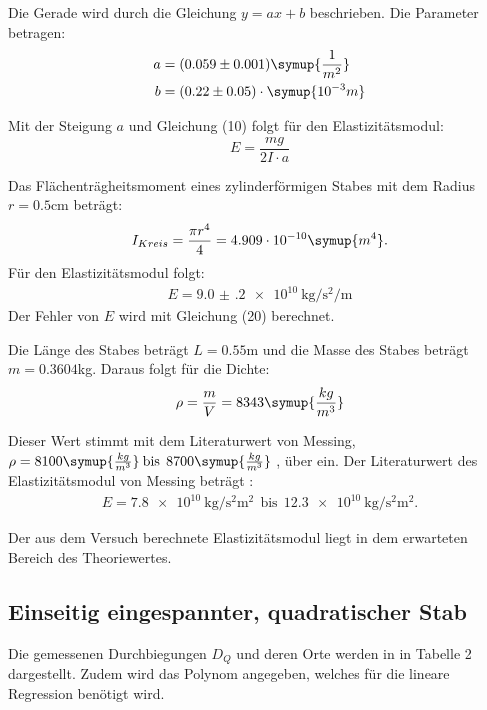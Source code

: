 Die Gerade wird durch die Gleichung $y = ax + b$ beschrieben. Die Parameter betragen:
\begin{align*}
  a &= (0.059 \pm 0.001) \symup{\frac{1}{m^2}}\\
  b &= (0.22  \pm 0.05) \cdot \symup{10^{-3}m}
\end{align*}

Mit der Steigung $a$ und Gleichung (10) folgt für den Elastizitätsmodul:
\begin{equation}
  E = \frac{mg}{2I \cdot a}
\end{equation}

Das Flächenträgheitsmoment eines zylinderförmigen Stabes mit dem Radius
$r = 0.5$cm beträgt:
\begin{equation}
  I_{Kreis} = \frac{\pi r^4}{4} = 4.909 \cdot 10^{-10} \symup{m^4} .
\end{equation}
Für den Elastizitätsmodul folgt:
\begin{align*}
  E = \SI{9.0(2)e10}{\kilo\gram\per\second\squared\per\meter}
\end{align*}
Der Fehler von $E$ wird mit Gleichung (20) berechnet.

Die Länge des Stabes beträgt $L = 0.55$m und die Masse des Stabes beträgt $m = 0.3604$kg.
Daraus folgt für die Dichte:
\begin{equation}
  \rho = \frac{m}{V} = 8343 \symup{\frac{kg}{m^3}}
\end{equation}

Dieser Wert stimmt mit dem Literaturwert von Messing, $\rho =8100\symup{\frac{kg}{m^3}}\: \text{bis}\:\: 8700\symup{\frac{kg}{m^3}}$ \cite{sample2},
über ein.
Der Literaturwert des Elastizitätsmodul von Messing beträgt \cite{sample2}:
\begin{align*}
  E = \SI{7.8e10}{\kilo\gram\per\second\squared\square\meter} \:\: \text{bis} \:\:
  \SI{12.3e10}{\kilo\gram\per\second\squared\square\meter}.
\end{align*}

Der aus dem Versuch berechnete Elastizitätsmodul liegt in dem erwarteten Bereich des Theoriewertes.

\subsection{Einseitig eingespannter, quadratischer Stab}
Die gemessenen Durchbiegungen $D_Q$ und deren Orte werden in in Tabelle 2 dargestellt. Zudem wird
das Polynom angegeben, welches für die lineare Regression benötigt wird.

